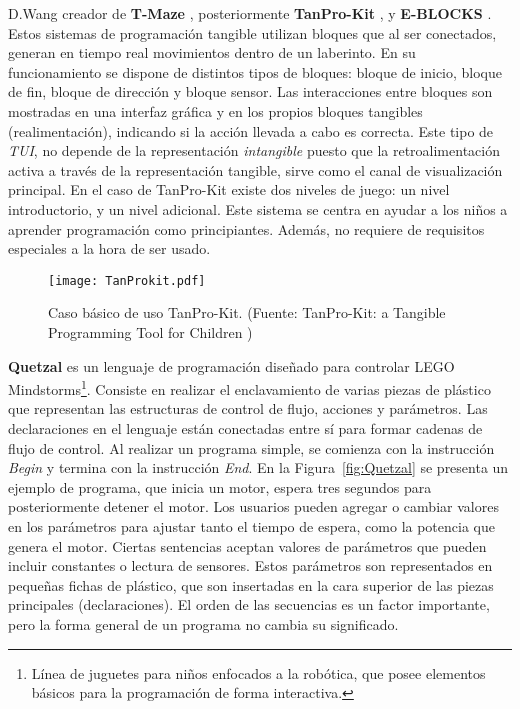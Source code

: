 D.Wang creador de \textbf{T-Maze} \cite{Wang_T-Maze}, posteriormente \textbf{TanPro-Kit} \cite{Wang_TanPro-kit}, y \textbf{E-BLOCKS} \cite{Wang_E-BLOCKS}. Estos sistemas de programación tangible utilizan bloques que al ser conectados, generan en tiempo real movimientos dentro de un laberinto. En su funcionamiento se dispone de distintos tipos de bloques: bloque de inicio, bloque de fin, bloque de dirección y bloque sensor. Las interacciones entre bloques son mostradas en una interfaz gráfica y en los propios bloques tangibles (realimentación), indicando si la acción llevada a cabo es correcta. Este tipo de \emph{TUI}, no depende de la representación \emph{intangible} puesto que la retroalimentación activa a través de la representación tangible, sirve como el canal de visualización principal.
En el caso de TanPro-Kit existe dos niveles de juego: un nivel introductorio, y un nivel adicional. Este sistema se centra en ayudar a los niños a aprender programación como principiantes. Además, no requiere de requisitos especiales a la hora de ser usado.


\begin{figure}[!h]
\begin{center}
\texttt{[image: TanProkit.pdf]}
\caption{Caso básico de uso TanPro-Kit. (Fuente: TanPro-Kit: a Tangible Programming Tool for Children \cite{Wang_TanPro-kit})}
\label{fig:TanProKit}
\end{center}
\end{figure}


\textbf{Quetzal} \cite{Quetzal} es un lenguaje de programación diseñado para controlar LEGO Mindstorms\footnote{Línea de juguetes para niños enfocados a la robótica, que posee elementos básicos para la programación de forma interactiva.}. Consiste en realizar el enclavamiento de varias piezas de plástico que representan las estructuras de control de flujo, acciones y parámetros. Las declaraciones en el lenguaje están conectadas entre sí para formar cadenas de flujo de control.
Al realizar un programa simple, se comienza con la instrucción \emph{Begin} y termina con la instrucción \emph{End}. En la Figura~\ref{fig:Quetzal} se presenta un ejemplo de programa, que inicia un motor, espera tres segundos para posteriormente detener el motor. Los usuarios pueden agregar o cambiar valores en los parámetros para ajustar tanto el tiempo de espera, como la potencia que genera el motor. Ciertas sentencias aceptan valores de parámetros que pueden incluir constantes o lectura de sensores. Estos parámetros son representados en pequeñas fichas de plástico, que son insertadas en la cara superior de las piezas principales (declaraciones). El orden de las secuencias es un factor importante, pero la forma general de un programa no cambia su significado.

